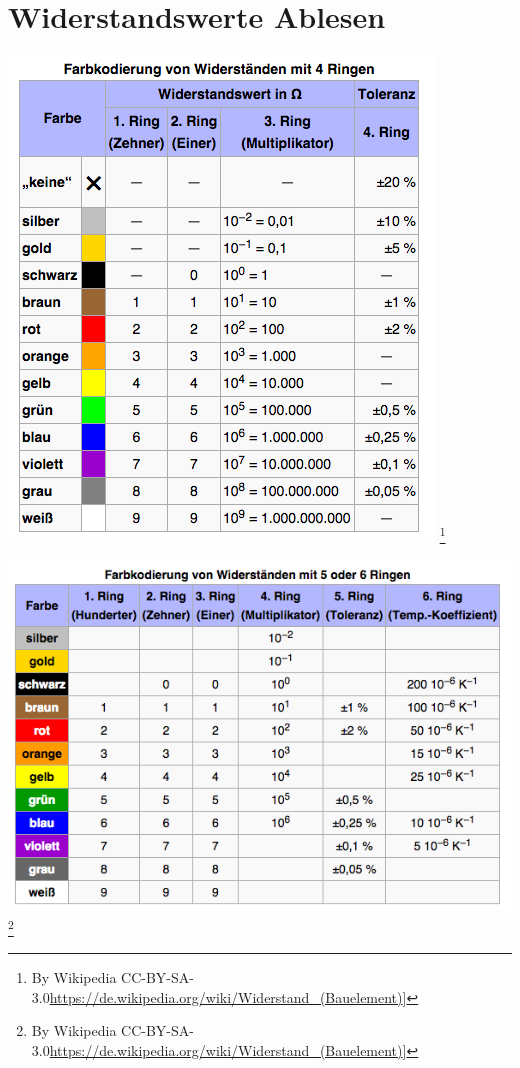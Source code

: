 \section*{Widerstandswerte Ablesen}

\begin{frame}
	\begin{center}
        \includegraphics[width=.74\textwidth]{e04/4-Ringe.png}
        \footnote{\tiny By Wikipedia CC-BY-SA-3.0\url{https://de.wikipedia.org/wiki/Widerstand_(Bauelement)}]}
\end{center}
\end{frame}

\begin{frame}
	\begin{center}
        \includegraphics[width=1\textwidth]{e04/5-Ringe.png}
        \footnote{\tiny By Wikipedia CC-BY-SA-3.0\url{https://de.wikipedia.org/wiki/Widerstand_(Bauelement)}]}
\end{center}
\end{frame}

